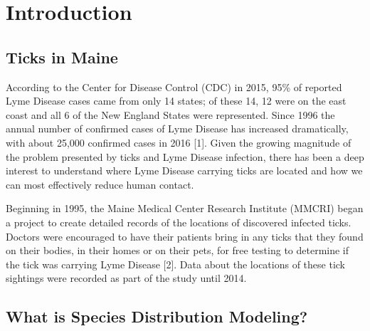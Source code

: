 
\chapter{Introduction} %

\label{Chapter1} %


\newcommand{\keyword}[1]{\textbf{#1}}
\newcommand{\tabhead}[1]{\textbf{#1}}
\newcommand{\code}[1]{\texttt{#1}}
\newcommand{\file}[1]{\texttt{\bfseries#1}}
\newcommand{\option}[1]{\texttt{\itshape#1}}


\section{Ticks in Maine}

According to the Center for Disease Control (CDC) in 2015, 95\% of reported Lyme Disease cases came from only 14 states; of these 14, 12 were on the east coast and all 6 of the New England States were represented. Since 1996 the annual number of confirmed cases of Lyme Disease has increased dramatically, with about 25,000 confirmed cases in 2016 [1]. Given the growing magnitude of the problem presented by ticks and Lyme Disease infection, there has been a deep interest to understand where Lyme Disease carrying ticks are located and how we can most effectively reduce human contact. \newline

\noindent Beginning in 1995, the Maine Medical Center Research Institute (MMCRI) began a project to create detailed records of the locations of discovered infected ticks. Doctors were encouraged to have their patients bring in any ticks that they found on their bodies, in their homes or on their pets, for free testing to determine if the tick was carrying Lyme Disease [2]. Data about the locations of these tick sightings were recorded as part of the study until 2014. \newline

\section{What is Species Distribution Modeling?}

